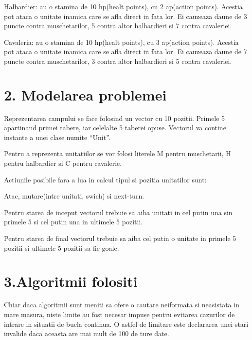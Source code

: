 \documentclass{article} %
\begin{document}
\noindent Halbardier: au o stamina de 10 hp(healt points), cu 2 ap(action points). Acestia pot ataca o unitate inamica care se afla direct in fata lor. Ei cauzeaza daune de 3 puncte contra muschetarilor, 5 contra altor halbardieri si 7 contra cavaleriei.

\noindent Cavaleria: au o stamina de 10 hp(healt points), cu 3 ap(action points). Acestia pot ataca o unitate inamica care se afla direct in fata lor. Ei cauzeaza daune de 7 puncte contra muschetarilor, 3 contra altor halbardieri si 5 contra cavaleriei.

\noindent 
\section{2. Modelarea problemei}

\noindent 

\noindent Reprezentarea campului se face folosind un vector cu 10 pozitii. Primele 5 apartinand primei tabere, iar celelalte 5 taberei opuse. Vectorul va contine instante a unei clase numite ``Unit''.

\noindent Pentru a reprezenta unitatiilor se vor folosi literele M pentru muschetarii, H pentru halbardier si C pentru cavalerie.

\noindent Actiunile posibile fara a lua in calcul tipul si pozitia unitatilor sunt:

\noindent Atac, mutare(intre unitati, swich) si next-turn. 

\noindent Pentru starea de inceput vectorul trebuie sa aiba unitati in cel putin una sin primele 5 si cel putin una in ultimele 5 pozitii.

\noindent Pentru starea de final vectorul trebuie sa aiba cel putin o unitate in primele 5 pozitii si ultimele 5 pozitii sa fie goale.

\noindent 

\noindent 
\section{3.Algoritmii folositi}

\noindent 

\noindent Chiar daca algoritmii sunt meniti sa ofere o cautare neiformata si neasistata in mare masura, niste limite au fost necesar impuse pentru evitarea cazurilor de intrare in situatii de bucla continua. O astfel de limitare este declararea unei stari invalide daca aceasta are mai mult de 100 de ture date.

\noindent 
\end{document}
